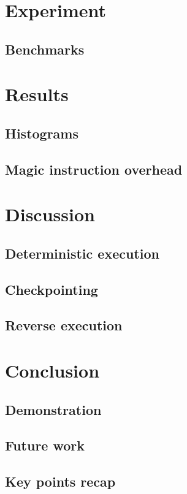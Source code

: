 \documentclass{beamer}
\begin{document}
	\section{Experiment}
	\subsection{Benchmarks}
	

	\section{Results}
        
	\subsection{Histograms}
	
	\subsection{Magic instruction overhead}
	

	\section{Discussion}
	\subsection{Deterministic execution}
	
	\subsection{Checkpointing}
	
	\subsection{Reverse execution}
	

	\section{Conclusion}
	\subsection{Demonstration}
	
	\subsection{Future work}
	
	\subsection{Key points recap}
	
\end{document}

